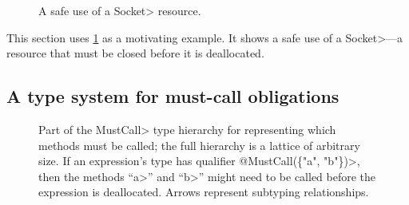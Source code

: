 \begin{figure}
  
  \prefigcaption
  \caption{A safe use of a \<Socket> resource.}
  \label{fig:example}
\end{figure}

\noindent
This section uses \cref{fig:example} as a motivating example.
It shows
a safe use of a \<Socket>---a resource that must be closed before
it is deallocated.

\subsection{A type system for must-call obligations}
\label{sec:must-call}

\begin{figure}

\caption{Part of the \<MustCall> type hierarchy for representing which methods must be
  called; the full hierarchy is a
  lattice of arbitrary size.
  If an expression's type has qualifier \<@Must\-Call(\{"a", "b"\})>, then
  the methods ``\<a>'' and ``\<b>'' might need to be called before the
  expression is deallocated.
  Arrows represent
  subtyping relationships.
}
\label{fig:must-call-hierarchy}
\end{figure}

